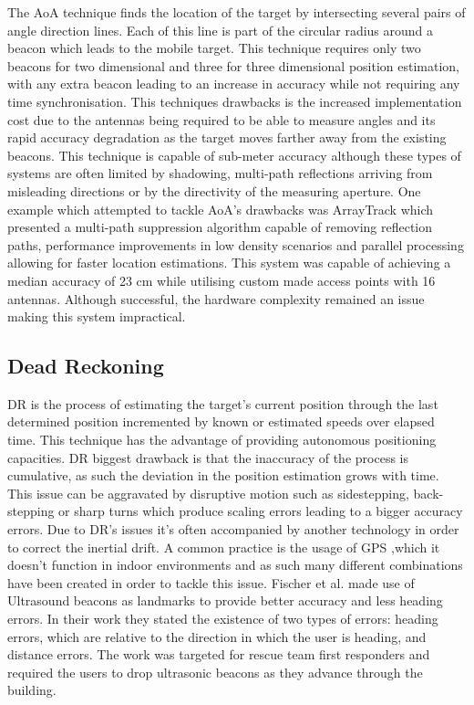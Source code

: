 The \ac{AoA} technique finds the location of the target by intersecting several pairs of angle direction lines. Each of this line is part of the circular radius around a beacon which leads to the mobile target. This technique requires only two beacons for two dimensional and three for three dimensional position estimation, with any extra beacon leading to an increase in accuracy while not requiring any time synchronisation.
This techniques drawbacks is the increased implementation cost due to the antennas being required to be able to measure angles and its rapid accuracy degradation as the target moves farther away from the existing beacons. This technique is capable of sub-meter accuracy although these types of systems are often limited by shadowing, multi-path reflections arriving from misleading directions or by the directivity of the measuring aperture. 
One example which attempted to tackle \ac{AoA}'s drawbacks was ArrayTrack \cite{arraytrack} which presented a multi-path suppression algorithm capable of removing reflection paths, performance improvements in low density scenarios and parallel processing allowing for faster location estimations. This system was capable of achieving a median accuracy of 23 cm while utilising custom made access points with 16 antennas. Although successful, the hardware complexity remained an issue making this system impractical.


\subsection{Dead Reckoning}
\label{subsec:dr}

\ac{DR} is the process of estimating the target's current position through the last determined position incremented by known or estimated speeds over elapsed time. This technique has the advantage of providing autonomous positioning capacities. \ac{DR} biggest drawback is that the inaccuracy of the process is cumulative, as such the deviation in the position estimation grows with time. This issue can be aggravated by disruptive motion such as sidestepping, back-stepping or sharp turns which produce scaling errors leading to a bigger accuracy errors. Due to \ac{DR}'s issues it's often accompanied by another technology in order to correct the inertial drift. A common practice is the usage of GPS ,which it doesn't function in indoor environments and as such many different combinations have been created in order to tackle this issue. Fischer et al. \cite{dr1} made use of Ultrasound beacons as landmarks to provide better accuracy and less heading errors. In their work they stated the existence of two types of errors: heading errors, which are relative to the direction in which the user is heading, and distance errors. The work was targeted for rescue team first responders and required the users to drop ultrasonic beacons as they advance through the building.

